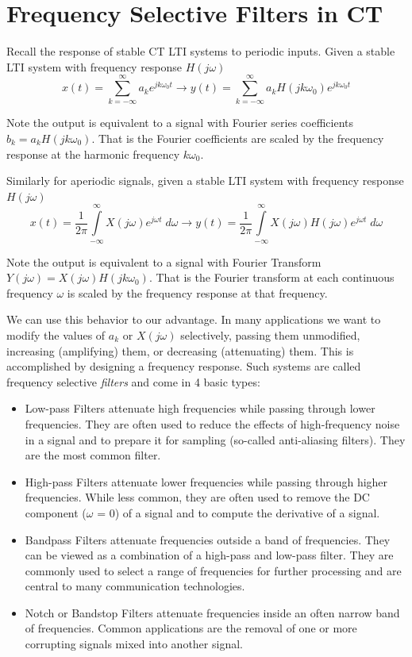 \chapter{Frequency Selective Filters in CT}

Recall the response of stable CT LTI systems to periodic inputs. Given a stable LTI system with frequency response $H(j\omega)$
\[       
x(t) = \sum\limits_{k = -\infty}^{\infty} a_k e^{jk\omega_0 t} \longrightarrow y(t) = \sum\limits_{k = -\infty}^{\infty} a_k H(jk\omega_0) e^{jk\omega_0 t} 
\]

Note the output is equivalent to a signal with Fourier series coefficients $b_k = a_k H(jk\omega_0)$. That is the Fourier coefficients are scaled by the frequency response at the harmonic frequency $k\omega_0$.

Similarly for aperiodic signals, given a stable LTI system with frequency response $H(j\omega)$
\[       
x(t) = \frac{1}{2\pi} \int\limits_{-\infty}^{\infty} X(j\omega) e^{j\omega t}\; d\omega \longrightarrow y(t) = \frac{1}{2\pi} \int\limits_{-\infty}^{\infty} X(j\omega) H(j\omega) e^{j\omega t}\; d\omega 
\]

Note the output is equivalent to a signal with Fourier Transform $Y(j\omega) = X(j\omega) H(jk\omega_0)$. That is the Fourier transform at each continuous frequency $\omega$ is scaled by the frequency response at that frequency.

We can use this behavior to our advantage. In many applications we want to modify the values of $a_k$ or $X(j\omega)$ selectively, passing them unmodified, increasing (amplifying) them, or decreasing (attenuating) them. This is accomplished by designing a frequency response. Such systems are called frequency selective \emph{filters} and come in 4 basic types:
\begin{itemize}
\item Low-pass Filters attenuate high frequencies while passing through lower frequencies. They are often used to reduce the effects of high-frequency noise in a signal and to prepare it for sampling (so-called anti-aliasing filters). They are the most common filter.
\item High-pass Filters attenuate lower frequencies while passing through higher frequencies. While less common, they are often used to remove the DC component ($\omega$ = 0) of a signal and to compute the derivative of a signal.
\item Bandpass Filters attenuate frequencies outside a band of frequencies. They can be viewed as a combination of a high-pass and low-pass filter. They are commonly used to select a range of frequencies for further processing and are central to many communication technologies.
\item Notch or Bandstop Filters attenuate frequencies inside an often narrow band of frequencies. Common applications are the removal of one or more corrupting signals mixed into another signal.
\end{itemize}

